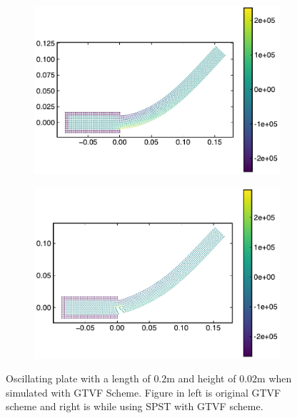 \documentclass[preprint,12pt]{elsarticle}
\begin{document}
%
%
\begin{figure}[!htpb]
  \centering
  \begin{subfigure}{0.48\textwidth}
    \centering
    \includegraphics[width=1\linewidth]{fig_18_a}
    \subcaption{}%
    \label{fig:oscillating-plate:gtvf-sun2019-a}
  \end{subfigure}
  \begin{subfigure}{0.48\textwidth}
    \centering
    \includegraphics[width=1\linewidth]{fig_18_b}
    \subcaption{}%
    \label{fig:oscillating-plate:gtvf-sun2019-b}
  \end{subfigure}
\caption{Oscillating plate with a length of $0.2$m and height of $0.02$m when
  simulated with GTVF Scheme. Figure in left is original GTVF scheme and right
  is while using SPST with GTVF scheme.}
\end{figure}
%
\end{document}
